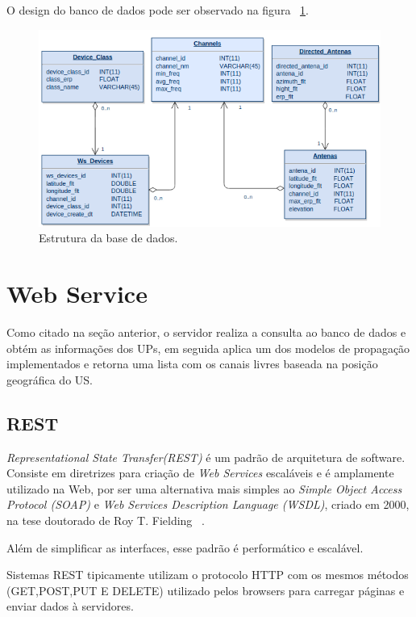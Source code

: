 O design do banco de dados pode ser observado na figura ~\ref{fig:databasebefore}.


\begin{figure}[databasebefore]
\centering
\includegraphics[width=1.0\textwidth]{figs/databasebefore}
\caption[Estrutura da base de dados.]
{Estrutura da base de dados.}
\label{fig:databasebefore}
\end{figure}


\section{Web Service}

Como citado na seção anterior, o servidor realiza a consulta ao banco de dados e obtém as informações dos UPs, em seguida aplica um dos modelos de propagação implementados e retorna uma lista com os canais livres baseada na posição geográfica do US.

\subsection{REST}
\textit{Representational State Transfer(REST)} é um padrão de arquitetura de software. Consiste em diretrizes para criação de \textit{Web Services} escaláveis e é amplamente utilizado na Web, por ser uma alternativa mais simples ao \textit{Simple Object Access Protocol (SOAP)} e \textit{Web Services Description Language (WSDL)},
 criado em 2000, na tese doutorado de Roy T. Fielding ~\cite{restcreator}.
 
Além de simplificar as interfaces, esse padrão é performático e escalável.

Sistemas REST tipicamente utilizam o protocolo HTTP com os mesmos métodos (GET,POST,PUT E DELETE) utilizado pelos browsers para carregar páginas e enviar dados à servidores.

